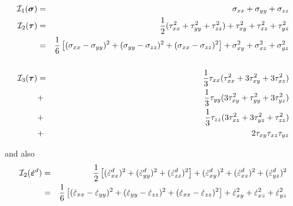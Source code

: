 \begin{eqnarray}
{\cal I}_1({\bm \sigma}) &=& \sigma_{xx}+\sigma_{yy}+\sigma_{zz}\\
{\cal I}_2({\bm \tau})   
&=&\frac{1}{2}(\tau_{xx}^2 + \tau_{yy}^2 + \tau_{zz}^2 ) + \tau_{xy}^2 + \tau_{xz}^2 + \tau_{yz}^2  \\
&=&\frac{1}{6}\left[(\sigma_{xx}-\sigma_{yy})^2 + (\sigma_{yy}-\sigma_{zz})^2 + (\sigma_{xx}-\sigma_{zz})^2 \right]  + \sigma_{xy}^2 + \sigma_{xz}^2 + \sigma_{yz}^2  \\
\nonumber\\
{\cal I}_3({\bm \tau}) 
&=& \frac{1}{3} \tau_{xx} (  \tau_{xx}^2 + 3 \tau_{xy}^2 + 3 \tau_{xz}^2  )     \nonumber\\
&+& \frac{1}{3} \tau_{yy} (3 \tau_{xy}^2 +   \tau_{yy}^2 + 3 \tau_{yz}^2  )     \nonumber\\
&+& \frac{1}{3} \tau_{zz} (3 \tau_{xz}^2 + 3 \tau_{yz}^2 +   \tau_{zz}^2)       \nonumber\\
&+& 2 \tau_{xy} \tau_{xz} \tau_{yz}  
\end{eqnarray}

and also
\begin{eqnarray}
{\cal I}_2(\dot{\bm{\varepsilon}}^d)
&=& \frac{1}{2} \left[ (\dot{\varepsilon}_{xx}^d)^2 + (\dot{\varepsilon}_{yy}^d)^2 + (\dot{\varepsilon}_{zz}^d)^2   \right] 
+ (\dot{\varepsilon}_{xy}^d)^2  
+ (\dot{\varepsilon}_{xz}^d)^2  
+ (\dot{\varepsilon}_{yz}^d)^2  \nonumber\\
&=& \frac{1}{6} \left[ (\dot{\varepsilon}_{xx}-\dot{\varepsilon}_{yy})^2 
+ (\dot{\varepsilon}_{yy}-\dot{\varepsilon}_{zz})^2 
+ (\dot{\varepsilon}_{xx}-\dot{\varepsilon}_{zz})^2 \right] 
+ \dot{\varepsilon}_{xy}^2 + \dot{\varepsilon}_{xz}^2 + \dot{\varepsilon}_{yz}^2  \\
\end{eqnarray}



